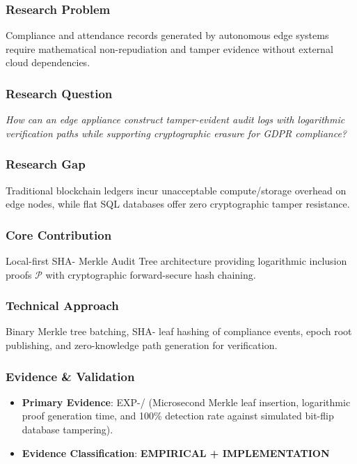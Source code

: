 \documentclass[11pt,letterpaper]{article}
\begin{document}
\subsubsection{Research Problem}
Compliance and attendance records generated by autonomous edge systems require mathematical non-\allowbreak repudiation and tamper evidence without external cloud dependencies.

\subsubsection{Research Question}
\begin{tcolorbox}[colback=blue!3!white,colframe=blue!50!black,title=Primary Scientific Question]
\textit{How can an edge appliance construct tamper-\allowbreak evident audit logs with logarithmic verification paths while supporting cryptographic erasure for GDPR compliance?}
\end{tcolorbox}

\subsubsection{Research Gap}
Traditional blockchain ledgers incur unacceptable compute/\allowbreak storage overhead on edge nodes, while flat SQL databases offer zero cryptographic tamper resistance.

\subsubsection{Core Contribution}
Local-\allowbreak first SHA- Merkle Audit Tree architecture providing logarithmic inclusion proofs $\mathcal{P}$ with cryptographic forward-\allowbreak secure hash chaining.

\subsubsection{Technical Approach}
Binary Merkle tree batching, SHA- leaf hashing of compliance events, epoch root publishing, and zero-\allowbreak knowledge path generation for verification.

\subsubsection{Evidence \& Validation}
\begin{itemize}[leftmargin=*]
    \item \textbf{Primary Evidence}: EXP-/ (Microsecond Merkle leaf insertion, logarithmic proof generation time, and 100\% detection rate against simulated bit-\allowbreak flip database tampering).
    \item \textbf{Evidence Classification}: \textbf{EMPIRICAL + IMPLEMENTATION}
\end{itemize}
\end{document}
